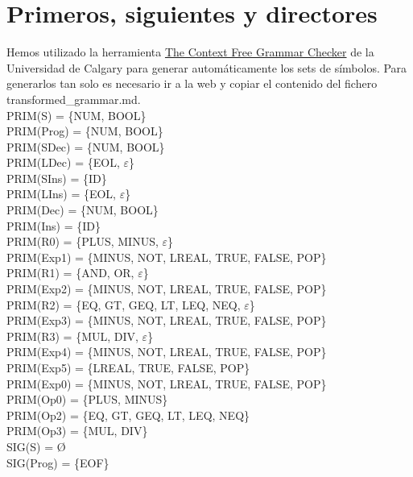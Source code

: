 \documentclass[\main/MemoriaPL.tex]{subfiles}
\begin{document}
  \newpage
  \section{Primeros, siguientes y directores}
    \par
    Hemos utilizado la herramienta \href{http://smlweb.cpsc.ucalgary.ca/}{The Context Free Grammar Checker}
    de la Universidad de Calgary para generar automáticamente los sets de símbolos. Para generarlos
    tan solo es necesario ir a la web y copiar el contenido del fichero transformed\_grammar.md.\\
    \vspace{2mm}
    PRIM(S) = \{NUM, BOOL\}\\
    PRIM(Prog) = \{NUM, BOOL\}\\
    PRIM(SDec) = \{NUM, BOOL\}\\
    PRIM(LDec) = \{EOL, $\varepsilon$\}\\
    PRIM(SIns) = \{ID\}\\
    PRIM(LIns) = \{EOL, $\varepsilon$\}\\
    PRIM(Dec) = \{NUM, BOOL\}\\
    PRIM(Ins) = \{ID\}\\
    PRIM(R0) = \{PLUS, MINUS, $\varepsilon$\}\\
    PRIM(Exp1) = \{MINUS, NOT, LREAL, TRUE, FALSE, POP\}\\
    PRIM(R1) = \{AND, OR, $\varepsilon$\}\\
    PRIM(Exp2) = \{MINUS, NOT, LREAL, TRUE, FALSE, POP\}\\
    PRIM(R2) = \{EQ, GT, GEQ, LT, LEQ, NEQ, $\varepsilon$\}\\
    PRIM(Exp3) = \{MINUS, NOT, LREAL, TRUE, FALSE, POP\}\\
    PRIM(R3) = \{MUL, DIV, $\varepsilon$\}\\
    PRIM(Exp4) = \{MINUS, NOT, LREAL, TRUE, FALSE, POP\}\\
    PRIM(Exp5) = \{LREAL, TRUE, FALSE, POP\}\\
    PRIM(Exp0) = \{MINUS, NOT, LREAL, TRUE, FALSE, POP\}\\
    PRIM(Op0) = \{PLUS, MINUS\}\\
    PRIM(Op2) = \{EQ, GT, GEQ, LT, LEQ, NEQ\}\\
    PRIM(Op3) = \{MUL, DIV\}\\
    \vspace{2mm}
    SIG(S) = \O\\
    SIG(Prog) = \{EOF\}\\
\end{document}
